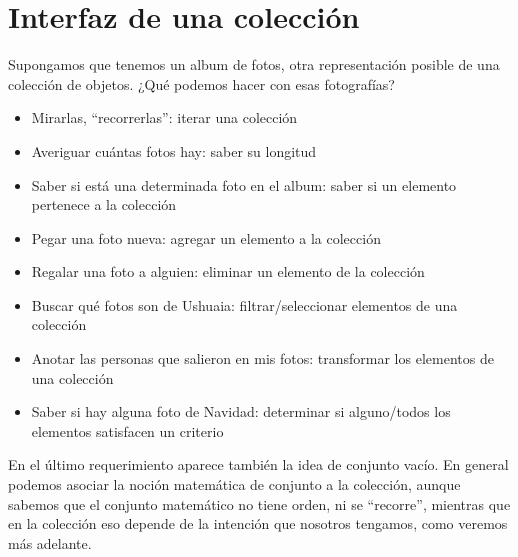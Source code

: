 \documentclass[a4paper,12pt]{book}
\begin{document}
\section{Interfaz de una colección}
Supongamos que tenemos un album de fotos, otra representación posible de una colección de objetos.
¿Qué podemos hacer con esas fotografías?
\\
\begin{itemize}
\item Mirarlas, ``recorrerlas'': iterar una colección
\item Averiguar cuántas fotos hay: saber su longitud
\item Saber si está una determinada foto en el album: saber si un elemento pertenece a la colección
\item Pegar una foto nueva: agregar un elemento a la colección
\item Regalar una foto a alguien: eliminar un elemento de la colección
\item Buscar qué fotos son de Ushuaia: filtrar/seleccionar elementos de una colección
\item Anotar las personas que salieron en mis fotos: transformar los elementos de una colección
\item Saber si hay alguna foto de Navidad: determinar si alguno/todos los elementos satisfacen 
un criterio
\end{itemize}
En el último requerimiento aparece también la idea de conjunto vacío. 
En general podemos asociar la noción matemática de conjunto a la colección, aunque sabemos que el conjunto
matemático no tiene orden, ni se ``recorre'', mientras que en la colección eso depende de la intención que
nosotros tengamos, como veremos más adelante.
\\
\end{document}
